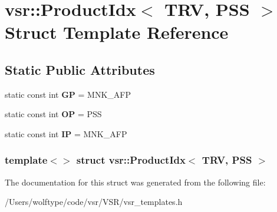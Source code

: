 \hypertarget{structvsr_1_1_product_idx_3_01_t_r_v_00_01_p_s_s_01_4}{\section{vsr\-:\-:Product\-Idx$<$ T\-R\-V, P\-S\-S $>$ Struct Template Reference}
\label{structvsr_1_1_product_idx_3_01_t_r_v_00_01_p_s_s_01_4}
}
\subsection*{Static Public Attributes}
\begin{DoxyCompactItemize}
\item 
\hypertarget{structvsr_1_1_product_idx_3_01_t_r_v_00_01_p_s_s_01_4_accc5ce5a47edeb094ed53cf2fb019cca}{static const int {\bfseries G\-P} = M\-N\-K\-\_\-\-A\-F\-P}\label{structvsr_1_1_product_idx_3_01_t_r_v_00_01_p_s_s_01_4_accc5ce5a47edeb094ed53cf2fb019cca}

\item 
\hypertarget{structvsr_1_1_product_idx_3_01_t_r_v_00_01_p_s_s_01_4_aba7bc11f149b2229145326de476befcc}{static const int {\bfseries O\-P} = P\-S\-S}\label{structvsr_1_1_product_idx_3_01_t_r_v_00_01_p_s_s_01_4_aba7bc11f149b2229145326de476befcc}

\item 
\hypertarget{structvsr_1_1_product_idx_3_01_t_r_v_00_01_p_s_s_01_4_aea6b5be1ab84baec29e587b09cd805a0}{static const int {\bfseries I\-P} = M\-N\-K\-\_\-\-A\-F\-P}\label{structvsr_1_1_product_idx_3_01_t_r_v_00_01_p_s_s_01_4_aea6b5be1ab84baec29e587b09cd805a0}

\end{DoxyCompactItemize}
\subsubsection*{template$<$$>$ struct vsr\-::\-Product\-Idx$<$ T\-R\-V, P\-S\-S $>$}



The documentation for this struct was generated from the following file\-:\begin{DoxyCompactItemize}
\item 
/\-Users/wolftype/code/vsr/\-V\-S\-R/vsr\-\_\-templates.\-h\end{DoxyCompactItemize}
